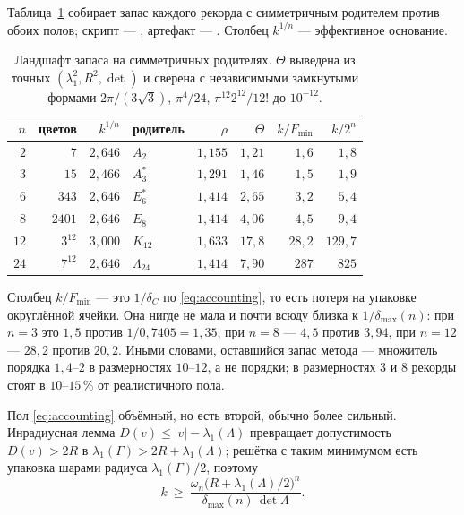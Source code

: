 Таблица~\ref{tab:landscape} собирает запас каждого рекорда с симметричным
родителем против обоих полов; скрипт ---
, артефакт ---
. Столбец $k^{1/n}$ --- эффективное
основание.

\begin{table}[htbp]
\centering
\caption{Ландшафт запаса на симметричных родителях. $\Theta$ выведена из точных
$(\lambda_1^2,R^2,\det)$ и сверена с независимыми замкнутыми формами
$2\pi/(3\sqrt3)$, $\pi^4/24$, $\pi^{12}2^{12}/12!$ до $10^{-12}$.}
\label{tab:landscape}
\begin{tabular}{@{}rrrlrrrr@{}}
\toprule
$n$ & цветов & $k^{1/n}$ & родитель & $\rho$ & $\Theta$ & $k/F_{\min}$ & $k/2^n$\\
\midrule
$2$  & $7$          & $2{,}646$ & $A_2$          & $1{,}155$ & $1{,}21$ & $1{,}6$ & $1{,}8$\\
$3$  & $15$         & $2{,}466$ & $A_3^*$        & $1{,}291$ & $1{,}46$ & $1{,}5$ & $1{,}9$\\
$6$  & $343$        & $2{,}646$ & $E_6^*$        & $1{,}414$ & $2{,}65$ & $3{,}2$ & $5{,}4$\\
$8$  & $2401$       & $2{,}646$ & $E_8$          & $1{,}414$ & $4{,}06$ & $4{,}5$ & $9{,}4$\\
$12$ & $3^{12}$     & $3{,}000$ & $K_{12}$       & $1{,}633$ & $17{,}8$ & $28{,}2$& $129{,}7$\\
$24$ & $7^{12}$     & $2{,}646$ & $\Lambda_{24}$ & $1{,}414$ & $7{,}90$ & $287$   & $825$\\
\bottomrule
\end{tabular}
\end{table}

Столбец $k/F_{\min}$ --- это $1/\delta_C$ по \eqref{eq:accounting}, то есть
потеря на упаковке округлённой ячейки. Она нигде не мала и почти всюду близка к
$1/\delta_{\max}(n)$: при $n=3$ это $1{,}5$ против $1/0{,}7405=1{,}35$, при
$n=8$ --- $4{,}5$ против $3{,}94$, при $n=12$ --- $28{,}2$ против $20{,}2$. Иными
словами, оставшийся запас метода --- множитель порядка $1{,}4$--$2$ в
размерностях $10$--$12$, а не порядки; в размерностях $3$ и $8$ рекорды стоят в
$10$--$15\,\%$ от реалистичного пола.

Пол \eqref{eq:accounting} объёмный, но есть второй, обычно более сильный.
Инрадиусная лемма $D(v)\le|v|-\lambda_1(\Lambda)$ превращает допустимость
$D(v)>2R$ в $\lambda_1(\Gamma)>2R+\lambda_1(\Lambda)$; решётка с таким минимумом
есть упаковка шарами радиуса $\lambda_1(\Gamma)/2$, поэтому
\begin{equation}\label{eq:packfloor}
k\ \ge\ \frac{\omega_n\bigl(R+\lambda_1(\Lambda)/2\bigr)^{n}}
             {\delta_{\max}(n)\,\det\Lambda}.
\end{equation}

